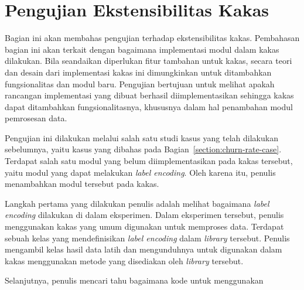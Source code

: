 
\section{Pengujian Ekstensibilitas Kakas}

Bagian ini akan membahas pengujian terhadap ekstensibilitas kakas.
Pembahasan bagian ini akan terkait dengan bagaimana implementasi modul dalam kakas dilakukan.
Bila seandaikan diperlukan fitur tambahan untuk kakas, secara teori dan desain dari implementasi kakas ini dimungkinkan untuk ditambahkan fungsionalitas dan modul baru.
Pengujian bertujuan untuk melihat apakah rancangan implementasi yang dibuat berhasil diimplementasikan sehingga kakas dapat ditambahkan fungsionalitasnya, khususnya dalam hal penambahan modul pemrosesan data.

Pengujian ini dilakukan melalui salah satu studi kasus yang telah dilakukan sebelumnya, yaitu kasus yang dibahas pada Bagian~\ref{section:churn-rate-case}.
Terdapat salah satu modul yang belum diimplementasikan pada kakas tersebut, yaitu modul yang dapat melakukan \textit{label encoding}.
Oleh karena itu, penulis menambahkan modul tersebut pada kakas.

Langkah pertama yang dilakukan penulis adalah melihat bagaimana \textit{label encoding} dilakukan di dalam eksperimen.
Dalam eksperimen tersebut, penulis menggunakan kakas  yang umum digunakan untuk memproses data.
Terdapat sebuah kelas yang mendefinisikan \textit{label encoding} dalam \textit{library} tersebut.
Penulis mengambil kelas hasil data latih dan mengunduhnya untuk digunakan dalam kakas menggunakan metode yang disediakan oleh \textit{library} tersebut.

Selanjutnya, penulis mencari tahu bagaimana kode untuk menggunakan 

